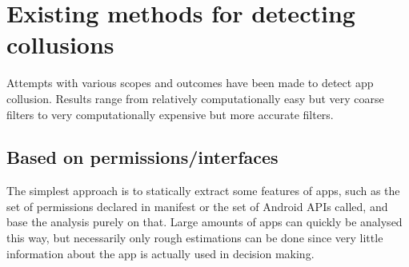 \documentclass[article, oneside]{aaltoseries}
\begin{document}
\section{Existing methods for detecting collusions}
\label{sec:approaches}

Attempts with various scopes and outcomes have been made to detect app collusion. Results range from relatively computationally easy but very coarse filters to very computationally expensive but more accurate filters. 

\subsection{Based on permissions/interfaces}

The simplest approach is to statically extract some features of apps, such as the set of permissions declared in manifest or the set of Android APIs called, and base the analysis purely on that. Large amounts of apps can quickly be analysed this way, but necessarily only rough estimations can be done since very little information about the app is actually used in decision making.
\end{document}
